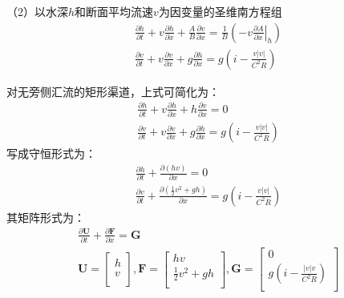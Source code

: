（2）以水深$h$和断面平均流速$v$为因变量的圣维南方程组
\begin{equation}
  \begin{gathered}
    \frac{\partial h}{\partial t}
    +
    v\frac{\partial h}{\partial x}
    +
    \frac{A}{B}\frac{\partial v}{\partial x}
    =
    \frac{1}{B}
    \left(
    - v\left.\frac{\partial A}{\partial x}\right|_{h}
    \right)
    \\
    \frac{\partial v}{\partial t}
    +
    v\frac{\partial v}{\partial x}
    +
    g\frac{\partial h}{\partial x}
    =
    g
    \left(
    i-\frac{v|v|}{C^{2}R}
    \right)
  \end{gathered}
  \label{EqCGe_SV_hU}
\end{equation}

对无旁侧汇流的矩形渠道，上式可简化为：
\begin{equation}
  \begin{gathered}
    \frac{\partial h}{\partial t}
    +
    v\frac{\partial h}{\partial x}
    +
    h\frac{\partial v}{\partial x}
    =
    0
    \\
    \frac{\partial v}{\partial t}
    +
    v\frac{\partial v}{\partial x}
    +
    g\frac{\partial h}{\partial x}
    =
    g
    \left(
    i-\frac{v|v|}{C^{2}R}
    \right)
  \end{gathered}
  \label{EqCGe_SV_hU_rect}
\end{equation}
写成守恒形式为：
\begin{equation}
  \begin{gathered}
    \frac{\partial h}{\partial t}
    +
    \frac{\partial (hv)}{\partial x}
    =
    0
    \\
    \frac{\partial v}{\partial t}
    +
    \frac{\partial (\frac{1}{2}v^{2} + gh)}{\partial x}
    =
    g
    \left(
    i-\frac{v|v|}{C^{2}R}
    \right)
  \end{gathered}
  \label{EqCGe_SV_hU_rect_conser}
\end{equation}
其矩阵形式为：
\begin{equation}
  \begin{gathered}
\frac{\partial \mathbf{U}}{\partial t} +
\frac{\partial \mathbf{F}}{\partial x} =
\mathbf{G}
\\
  \mathbf{U} =
  \begin{bmatrix}
    h \\
    v \\
  \end{bmatrix}
  ,
  \mathbf{F} =
  \begin{bmatrix}
    hv \\
    \frac{1}{2}v^{2}+gh \\
  \end{bmatrix}
  ,
  \mathbf{G} =
  \begin{bmatrix}
    0 \\
    g(i - \frac{|v|v}{C^{2}R}) \\
  \end{bmatrix}
\end{gathered}
  \label{EqCGe_SV_hU_rect_conser_matrix}
\end{equation}

